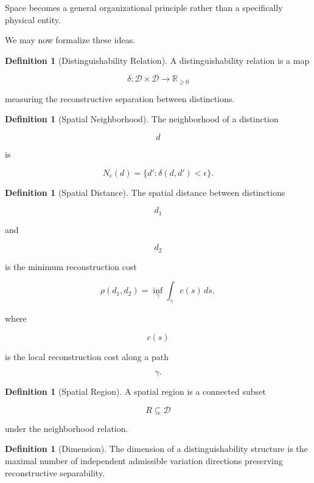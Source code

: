 \documentclass[12pt,oneside]{article}
\theoremstyle{definition}
\newtheorem{definition}[theorem]{Definition} \newtheorem{axiom}[theorem]{Axiom} \newtheorem{remark}[theorem]{Remark} \newtheorem{example}[theorem]{Example}
\begin{document}
Space becomes a general organizational principle rather than a specifically physical entity.

We may now formalize these ideas.

\begin{definition}[Distinguishability Relation]

A distinguishability relation is a map

\[
\delta :
\mathcal D \times \mathcal D
\rightarrow
\mathbb R_{\ge 0}
\]

measuring the reconstructive separation between distinctions.

\end{definition}

\begin{definition}[Spatial Neighborhood]

The neighborhood of a distinction

\[
d
\]

is

\[
N_\epsilon(d)
=
\{
d'
:
\delta(d,d')
<
\epsilon
\}.
\]

\end{definition}

\begin{definition}[Spatial Distance]

The spatial distance between distinctions

\[
d_1
\]

and

\[
d_2
\]

is the minimum reconstruction cost

\[
\rho(d_1,d_2)
=
\inf_{\gamma}
\int_\gamma c(s)\,ds,
\]

where

\[
c(s)
\]

is the local reconstruction cost along a path

\[
\gamma.
\]

\end{definition}

\begin{definition}[Spatial Region]

A spatial region is a connected subset

\[
R
\subseteq
\mathcal D
\]

under the neighborhood relation.

\end{definition}

\begin{definition}[Dimension]

The dimension of a distinguishability structure is the maximal number of independent admissible variation directions preserving reconstructive separability.

\end{definition}
\end{document}

